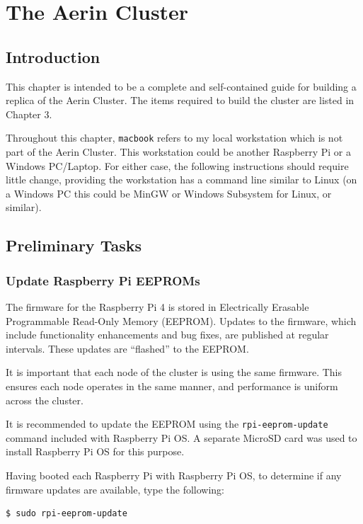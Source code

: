 \documentclass{report}
\begin{document}
\chapter{The Aerin Cluster}


%
%
\section{Introduction}

This chapter is intended to be a complete and self-contained guide for building a replica of the Aerin Cluster. The items required to build the cluster are listed in Chapter 3.

Throughout this chapter, \verb|macbook| refers to my local workstation which is not part of the Aerin Cluster. This workstation could be another Raspberry Pi or a Windows PC/Laptop. For either case, the following instructions should require little change, providing the workstation has a command line similar to Linux (on a Windows PC this could be MinGW or Windows Subsystem for Linux, or similar).


%
%
\section{Preliminary Tasks}


%
%
\subsection{Update Raspberry Pi EEPROMs}

The firmware for the Raspberry Pi 4 is stored in Electrically Erasable Programmable Read-Only Memory (EEPROM). Updates to the firmware, which include functionality enhancements and bug fixes, are published at regular intervals. These updates are ``flashed'' to the EEPROM.

It is important that each node of the cluster is using the same firmware. This ensures each node operates in the same manner, and performance is uniform across the cluster.

It is recommended to update the EEPROM using the \verb|rpi-eeprom-update| command included with Raspberry Pi OS. A separate MicroSD card was used to install Raspberry Pi OS for this purpose.

Having booted each Raspberry Pi with Raspberry Pi OS, to determine if any firmware updates are available, type the following:

\lstset{style=type}
\begin{lstlisting}[]
$ sudo rpi-eeprom-update
\end{lstlisting}
\end{document}
